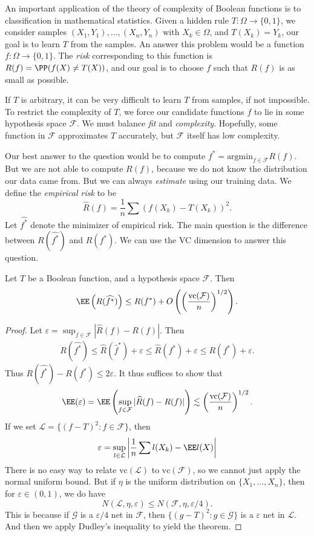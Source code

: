 An important application of the theory of complexity of Boolean functions is to classification in mathematical statistics. Given a hidden rule $T: \Omega \to \{ 0, 1 \}$, we consider samples $(X_1,Y_1), \dots, (X_n, Y_n)$ with $X_k \in \Omega$, and $T(X_k) = Y_k$, our goal is to learn $T$ from the samples. An answer this problem would be a function $f: \Omega \to \{ 0, 1 \}$. The {\it risk} corresponding to this function is $R(f) = \PP(f(X) \neq T(X))$, and our goal is to choose $f$ such that $R(f)$ is as small as possible.

If $T$ is arbitrary, it can be very difficult to learn $T$ from samples, if not impossible. To restrict the complexity of $T$, we force our candidate functions $f$ to lie in some hypothesis space $\mathcal{F}$. We must balance {\it fit} and {\it complexity}. Hopefully, some function in $\mathcal{F}$ approximates $T$ accurately, but $\mathcal{F}$ itself has low complexity.

Our best answer to the question would be to compute $f^* = \text{argmin}_{f \in \mathcal{F}} R(f)$. But we are not able to compute $R(f)$, because we do not know the distribution our data came from. But we can always {\it estimate} using our training data. We define the {\it empirical risk} to be
%
\[ \widehat{R}(f) = \frac{1}{n} \sum (f(X_k) - T(X_k))^2. \]
%
Let $\widehat{f^*}$ denote the minimizer of empirical risk. The main question is the difference between $R(\widehat{f^*})$ and $R(f^*)$. We can use the VC dimension to answer this question.

\begin{theorem}
	Let $T$ be a Boolean function, and a hypothesis space $\mathcal{F}$. Then
	\[ \EE \left( R(\widehat{f^*}) \right) \leq R(f^*) + O \left( \left( \frac{\text{vc}(\mathcal{F})}{n} \right)^{1/2} \right). \]
\end{theorem}
\begin{proof}
	Let $\varepsilon = \sup_{f \in \mathcal{F}} |\widehat{R}(f) - R(f)|$. Then
	\begin{align*}
		R \left( \widehat{f^*} \right) \leq \widehat{R} \left( \widehat{f}^* \right) + \varepsilon \leq \widehat{R}(f^*) + \varepsilon \leq R(f^*) + \varepsilon.
	\end{align*}
	Thus $R(\widehat{f^*}) - R(f^*) \leq 2 \varepsilon$. It thus suffices to show that
	\[ \EE(\varepsilon) = \EE \left( \sup_{f \in \mathcal{F}} |\widehat{R}(f) - R(f)| \right) \lesssim \left( \frac{\text{vc}(\mathcal{F})}{n} \right)^{1/2}. \]
	If we set $\mathcal{L} = \{ (f - T)^2 : f \in \mathcal{F} \}$, then
	\[ \varepsilon = \sup_{l \in \mathcal{L}} \left| \frac{1}{n} \sum l(X_k) - \EE l(X) \right| \]
	There is no easy way to relate $\text{vc}(\mathcal{L})$ to $\text{vc}(\mathcal{F})$, so we cannot just apply the normal uniform bound. But if $\eta$ is the uniform distribution on $\{ X_1, \dots, X_n \}$, then for $\varepsilon \in (0,1)$, we do have
	\[ N(\mathcal{L}, \eta, \varepsilon) \leq N(\mathcal{F},\eta,\varepsilon/4). \]
	This is because if $\mathcal{G}$ is a $\varepsilon/4$ net in $\mathcal{F}$, then $\{ (g - T)^2 : g \in \mathcal{G} \}$ is a $\varepsilon$ net in $\mathcal{L}$. And then we apply Dudley's inequality to yield the theorem.
\end{proof}


